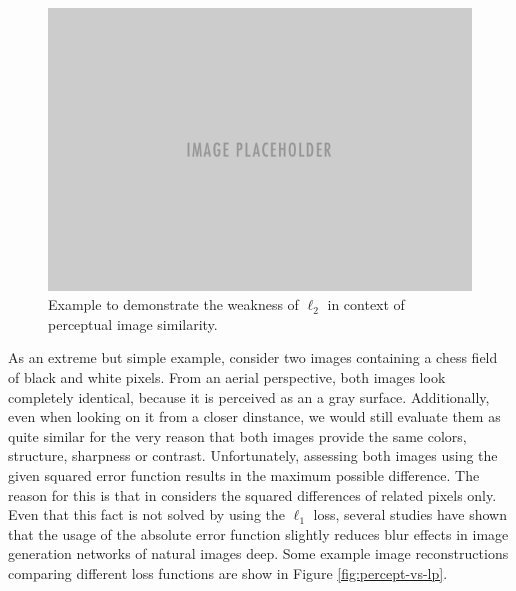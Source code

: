 \begin{figure}[htpb]
	\centering
	\includegraphics[scale=0.3]{figures/placeholder.png}
	\caption[Example: Weakness of $ \ell_{2} $]{Example to demonstrate the weakness of $ \ell_{2} $ in context of perceptual image similarity.} \label{fig:chessfield}
\end{figure}

As an extreme but simple example, consider two images containing a chess field of black and white pixels. From an aerial perspective, both images look completely identical, because it is perceived as an a gray surface. Additionally, even when looking on it from a closer dinstance, we would still evaluate them as quite similar for the very reason that both images provide the same colors, structure, sharpness or contrast. Unfortunately, assessing both images using the given squared error function results in the maximum possible difference. The reason for this is that in considers the squared differences of related pixels only. Even that this fact is not solved by using the $ \ell_{1} $ loss, several studies have shown that the usage of the absolute error function slightly reduces blur effects in image generation networks of natural images \parencite{loss-func-img-proc} \parencite{deep_multiscale_video_pred}{deep}. Some example image reconstructions comparing different loss functions are show in Figure \ref{fig:percept-vs-lp}.

